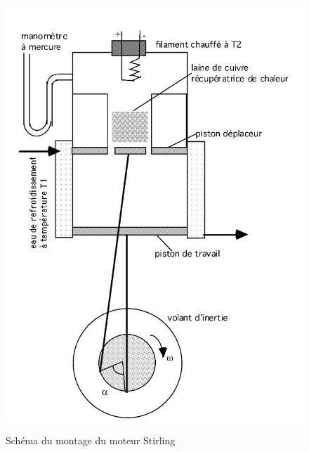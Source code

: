 \begin{figure}
    \centering
    \includegraphics[width=\linewidth]{figures/montage.png}
    \caption{Schéma du montage du moteur Stirling \cite{notice}}
    \label{fig:montage}
    \vspace{1cm}
\end{figure}

